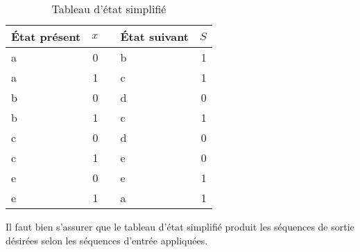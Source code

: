\documentclass[letter, oneside]{book}
\begin{document}
\begin{table}[htbp]
\caption{\label{tab:org3fe9b70}Tableau d'état simplifié}
\centering
\begin{tabular}{lrllr}
État présent & \(x\) &  & État suivant & \(S\)\\[0pt]
\hline
a & 0 &  & b & 1\\[0pt]
a & 1 &  & c & 1\\[0pt]
b & 0 &  & d & 0\\[0pt]
b & 1 &  & c & 1\\[0pt]
c & 0 &  & d & 0\\[0pt]
c & 1 &  & e & 0\\[0pt]
e & 0 &  & e & 1\\[0pt]
e & 1 &  & a & 1\\[0pt]
\end{tabular}
\end{table}

Il faut bien s'assurer que le tableau d'état simplifié produit les
séquences de sortie désirées selon les séquences d'entrée appliquées.
\end{document}
